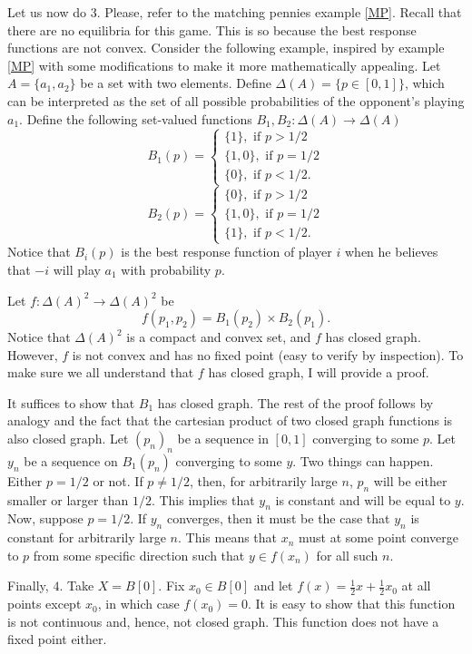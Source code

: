 \documentclass[../main.tex]{subfiles}
\begin{document}
    Let us now do 3. Please, refer to the matching pennies example 
    \ref{MP}. Recall that there are no equilibria for this game. This is so because the best response functions are not convex. Consider the following example, inspired by example \ref{MP} with some modifications to make it more mathematically appealing. Let $A = \{a_1,a_2\}$ be a set with two elements. Define $\Delta(A)=\{p\in[0,1]\}$, which can be interpreted as the set of all possible probabilities of the opponent's playing $a_1$. Define the following set-valued functions $B_1,B_2\colon\Delta(A)\to\Delta(A)$
    \[
        B_1(p) = 
        \begin{cases}
            \{1\},\text{ if }p>1/2\\
            \{1,0\},\text{ if }p=1/2\\
            \{0\},\text{ if }p<1/2.
        \end{cases}
    \]
    \[
        B_2(p) = 
        \begin{cases}
            \{0\},\text{ if }p>1/2\\
            \{1,0\},\text{ if }p=1/2\\
            \{1\},\text{ if }p<1/2.
        \end{cases}
    \]
    Notice that $B_i(p)$ is the best response function of player $i$ when he believes that $-i$ will play $a_1$ with probability $p$. 
    
    Let $f\colon\Delta(A)^2\to\Delta(A)^2$ be
    \[
        f(p_1,p_2) = B_1(p_2)\times B_2(p_1).
    \]
    Notice that $\Delta(A)^2$ is a compact and convex set, and $f$ has closed graph. However, $f$ is not convex and has no fixed point (easy to verify by inspection). To make sure we all understand that $f$ has closed graph, I will provide a proof.

    It suffices to show that $B_1$ has closed graph. The rest of the proof follows by analogy and the fact that the cartesian product of two closed graph functions is also closed graph. Let $(p_n)_n$ be a sequence in $[0,1]$ converging to some $p$. Let $y_n$ be a sequence on $B_1(p_n)$ converging to some $y$. Two things can happen. Either $p = 1/2$ or not. If $p\neq 1/2$, then, for arbitrarily large $n$, $p_n$ will be either smaller or larger than $1/2$. This implies that $y_n$ is constant and will be equal to $y$. Now, suppose $p = 1/2$. If $y_n$ converges, then it must be the case that $y_n$ is constant for arbitrarily large $n$. This means that $x_n$ must at some point converge to $p$ from some specific direction such that $y\in f(x_n)$ for all such $n$.

    Finally, $4$. Take $X = B[0]$. Fix $x_0\in B[0]$ and let $f(x) = \frac{1}{2}x + \frac{1}{2}x_0$ at all points except $x_0$, in which case $f(x_0) = 0$. It is easy to show that this function is not continuous and, hence, not closed graph. This function does not have a fixed point either.
\end{document}
